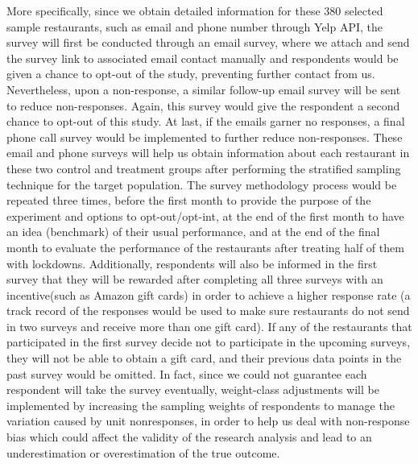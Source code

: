 \documentclass[
]{article}
\begin{document}
More specifically, since we obtain detailed information for these 380 selected sample restaurants, such as email and phone number through Yelp API, the survey will first be conducted through an email survey, where we attach and send the survey link to associated email contact manually and respondents would be given a chance to opt-out of the study, preventing further contact from us. Nevertheless, upon a non-response, a similar follow-up email survey will be sent to reduce non-responses. Again, this survey would give the respondent a second chance to opt-out of this study. At last, if the emails garner no responses, a final phone call survey would be implemented to further reduce non-responses. These email and phone surveys will help us obtain information about each restaurant in these two control and treatment groups after performing the stratified sampling technique for the target population. The survey methodology process would be repeated three times, before the first month to provide the purpose of the experiment and options to opt-out/opt-int, at the end of the first month to have an idea (benchmark) of their usual performance, and at the end of the final month to evaluate the performance of the restaurants after treating half of them with lockdowns. Additionally, respondents will also be informed in the first survey that they will be rewarded after completing all three surveys with an incentive(such as Amazon gift cards) in order to achieve a higher response rate (a track record of the responses would be used to make sure restaurants do not send in two surveys and receive more than one gift card). If any of the restaurants that participated in the first survey decide not to participate in the upcoming surveys, they will not be able to obtain a gift card, and their previous data points in the past survey would be omitted. In fact, since we could not guarantee each respondent will take the survey eventually, weight-class adjustments will be implemented by increasing the sampling weights of respondents to manage the variation caused by unit nonresponses, in order to help us deal with non-response bias which could affect the validity of the research analysis and lead to an underestimation or overestimation of the true outcome.
\end{document}
